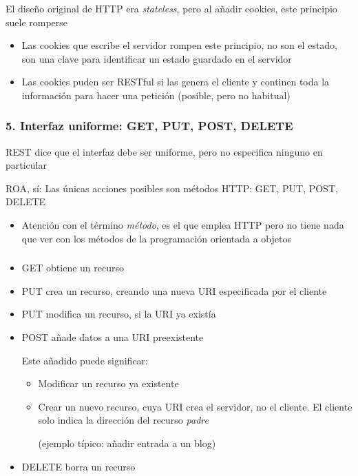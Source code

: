 \documentclass[ucs]{beamer}
\begin{document}
\begin{frame}[fragile]
\frametitle{}

El diseño original de HTTP era \emph{stateless}, pero al añadir cookies,
este principio suele romperse

\begin{itemize}
\item
Las cookies que escribe el servidor rompen este principio, no son el estado, son una
clave para identificar un estado guardado en el servidor
\item
Las cookies puden ser RESTful si las genera el cliente y continen toda la información
para hacer una petición (posible, pero no habitual)
\end{itemize}
\end{frame}




\begin{frame}[fragile]
\frametitle{5. Interfaz uniforme: GET, PUT, POST, DELETE}
REST dice que el interfaz debe ser uniforme, pero no especifica ninguno en particular

ROA, sí: Las únicas acciones posibles son métodos HTTP:   GET, PUT, POST, DELETE

\begin{itemize}
\item
Atención con el término \emph{método}, es el que emplea HTTP pero no tiene 
nada que ver con los métodos de la programación orientada a objetos
\end{itemize}



\end{frame}
\begin{frame}[fragile]
\frametitle{}

\begin{itemize}
\item
GET obtiene un recurso
\item
PUT crea un recurso, creando una nueva URI especificada por el cliente
\item
PUT modifica un recurso, si la URI ya existía
\item
POST añade datos a una URI preexistente

Este añadido puede significar:

\begin{itemize}
\item
Modificar un recurso ya existente
\item
Crear un nuevo recurso, cuya URI crea el servidor, no el cliente. El cliente
solo indica la dirección del recurso \emph{padre}

  (ejemplo típico: añadir entrada a un blog)
\end{itemize}

\item
DELETE borra un recurso
\end{itemize}

\end{frame}
\end{document}

